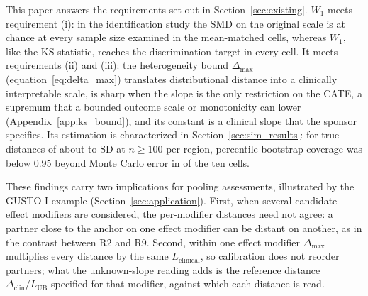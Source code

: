 \documentclass[AMA,Times1COL]{WileyNJDv5}
\begin{document}
This paper answers the requirements set out in Section~\ref{sec:existing}. $W_1$ meets requirement (i): in the identification study the SMD on the original scale is at chance at every sample size examined in the mean-matched cells, whereas $W_1$, like the KS statistic, reaches the discrimination target in every cell. It meets requirements (ii) and (iii): the heterogeneity bound \(\Delta_{\max}\) (equation~\ref{eq:delta_max}) translates distributional distance into a clinically interpretable scale, is sharp when the slope is the only restriction on the CATE, a supremum that a bounded outcome scale or monotonicity can lower (Appendix~\ref{app:ks_bound}), and its constant is a clinical slope that the sponsor specifies. Its estimation is characterized in Section~\ref{sec:sim_results}: for true distances of about  to  SD at $n \geq 100$ per region, percentile bootstrap coverage was below 0.95 beyond Monte Carlo error in  of the ten cells.

These findings carry two implications for pooling assessments, illustrated by the GUSTO-I example (Section~\ref{sec:application}). First, when several candidate effect modifiers are considered, the per-modifier distances need not agree: a partner close to the anchor on one effect modifier can be distant on another, as in the contrast between R2 and R9. Second, within one effect modifier $\Delta_{\max}$ multiplies every distance by the same $L_{\text{clinical}}$, so calibration does not reorder partners; what the unknown-slope reading adds is the reference distance $\Delta_{\text{clin}} / L_{\text{UB}}$ specified for that modifier, against which each distance is read.
\end{document}
